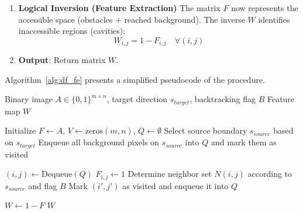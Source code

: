 \documentclass[a4paper,fleqn]{cas-dc}
\begin{document}
\begin{enumerate}
\begin{enumerate}
\begin{enumerate}
            \item For each neighbor $(i', j') \in N(i,j)$, if:
            \begin{itemize}
                \item $V_{i',j'} = \texttt{false}$,
                \item $A_{i',j'} = 0$ 
            \end{itemize}
            then:
            \begin{itemize}
                \item Enqueue $(i',j') \rightarrow Q$
                \item Mark $V_{i',j'} \leftarrow \texttt{true}$
            \end{itemize}
        \end{enumerate}
    \end{enumerate}

    \item \textbf{Logical Inversion (Feature Extraction)}
    The matrix $F$ now represents the accessible space (obstacles + reached background). The inverse $W$ identifies inaccessible regions (cavities):
    \begin{equation}
        W_{i,j} = 1 - F_{i,j} \quad \forall (i,j)
    \end{equation}
    
    \item \textbf{Output}: Return matrix $W$.
\end{enumerate}


Algorithm~\ref{alg:df_fe} presents a simplified pseudocode of the procedure.

\begin{algorithm}
\caption{Directional Flood-Fill Feature Extraction}
\label{alg:df_fe}
\begin{algorithmic}[1]

\Require Binary image $A \in \{0,1\}^{m \times n}$, target direction $s_{target}$, backtracking flag $B$
\Ensure Feature map $W$

\State Initialize $F \gets A$, $V \gets \text{zeros}(m,n)$, $Q \gets \emptyset$
\State Select source boundary $s_{source}$ based on $s_{target}$
\State Enqueue all background pixels on $s_{source}$ into $Q$ and mark them as visited

    \State $(i,j) \gets \text{Dequeue}(Q)$
    \State $F_{i,j} \gets 1$
    \State Determine neighbor set $N(i,j)$ according to $s_{source}$ and flag $B$
            \State Mark $(i',j')$ as visited and enqueue it into $Q$
        \EndIf
    \EndFor
\EndWhile

\State $W \gets 1 - F$
\State \Return $W$

\end{algorithmic}
\end{algorithm}
\end{document}
